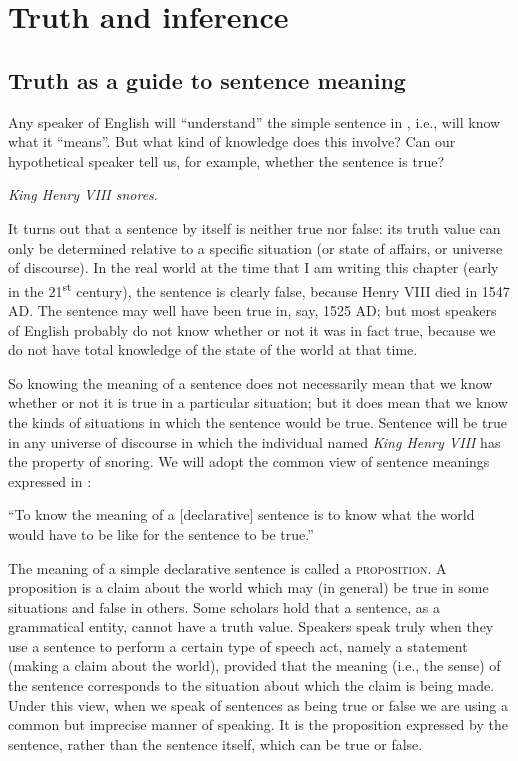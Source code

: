 \chapter{Truth and inference}\label{sec:3}

\section{Truth as a guide to sentence meaning}\label{sec:3.1}

Any speaker of English will “understand” the simple sentence in , i.e., will know what it “means”. But what kind of knowledge does this involve? Can our hypothetical speaker tell us, for example, whether the sentence is true?


\ea \label{ex:3.1}
\textit{King Henry VIII snores}.
\z


It turns out that a sentence by itself is neither true nor false: its truth value can only be determined relative to a specific situation (or state of affairs, or universe of discourse). In the real world at the time that I am writing this chapter (early in the 21\textsuperscript{st} century), the sentence is clearly false, because Henry VIII died in 1547 AD. The sentence may well have been true in, say, 1525 AD; but most speakers of English probably do not know whether or not it was in fact true, because we do not have total knowledge of the state of the world at that time.



So knowing the meaning of a sentence does not necessarily mean that we know whether or not it is true in a particular situation; but it does mean that we know the kinds of situations in which the sentence would be true. Sentence  will be true in any universe of discourse in which the individual named \textit{King Henry VIII} has the property of snoring. We will adopt the common view of sentence meanings expressed in :


\ea \label{ex:3.2}
“To know the meaning of a [declarative] sentence is to know what the world would have to be like for the sentence to be true.” \citep[4]{DowtyEtAl1981}
\z


The meaning of a simple declarative sentence is called a \textsc{proposition}. A proposition is a claim about the world which may (in general) be true in some situations and false in others. Some scholars hold that a sentence, as a grammatical entity, cannot have a truth value. Speakers speak truly when they use a sentence to perform a certain type of speech act, namely a statement (making a claim about the world), provided that the meaning (i.e., the sense) of the sentence corresponds to the situation about which the claim is being made. Under this view, when we speak of sentences as being true or false we are using a common but imprecise manner of speaking. It is the proposition expressed by the sentence, rather than the sentence itself, which can be true or false.



